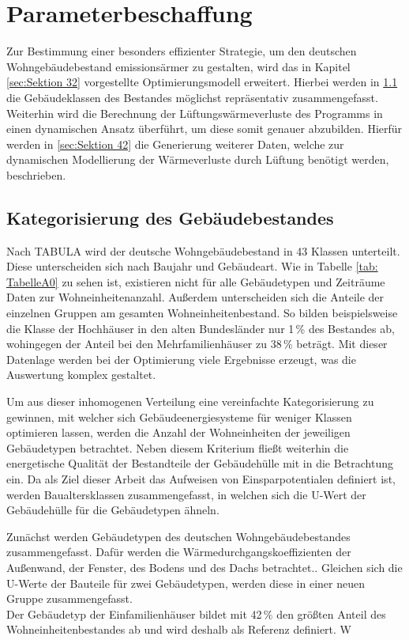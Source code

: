 \chapter{Parameterbeschaffung}

Zur Bestimmung einer besonders effizienter Strategie, um den deutschen Wohngebäudebestand emissionsärmer zu gestalten, wird das in Kapitel \ref{sec:Sektion 32} vorgestellte Optimierungsmodell erweitert.
Hierbei werden in \ref{sec:Sektion 41} die Gebäudeklassen des Bestandes möglichst repräsentativ zusammengefasst.
Weiterhin wird die Berechnung der Lüftungswärmeverluste des Programms in einen dynamischen Ansatz überführt, um diese somit genauer abzubilden.
Hierfür werden in \ref{sec:Sektion 42} die Generierung weiterer Daten, welche zur dynamischen Modellierung der Wärmeverluste durch Lüftung benötigt werden, beschrieben.

\section{Kategorisierung des Gebäudebestandes}
\label{sec:Sektion 41}

Nach TABULA wird der deutsche Wohngebäudebestand in 43 Klassen unterteilt.
Diese unterscheiden sich nach Baujahr und Gebäudeart.
Wie in Tabelle \ref{tab: TabelleA0} zu sehen ist, existieren nicht für alle Gebäudetypen und Zeiträume Daten zur Wohneinheitenanzahl.
Außerdem unterscheiden sich die Anteile der einzelnen Gruppen am gesamten Wohneinheitenbestand.
So bilden beispielsweise die Klasse der Hochhäuser in den alten Bundesländer nur 1\,\% des Bestandes ab, wohingegen der Anteil bei den Mehrfamilienhäuser zu 38\,\% beträgt.
Mit dieser Datenlage werden bei der Optimierung viele Ergebnisse erzeugt, was die Auswertung komplex gestaltet.

Um aus dieser inhomogenen Verteilung eine vereinfachte Kategorisierung zu gewinnen, mit welcher sich Gebäudeenergiesysteme für weniger Klassen optimieren lassen, werden die Anzahl der Wohneinheiten der jeweiligen Gebäudetypen betrachtet.
Neben diesem Kriterium fließt weiterhin die energetische Qualität der Bestandteile der Gebäudehülle mit in die Betrachtung ein.
Da als Ziel dieser Arbeit das Aufweisen von Einsparpotentialen definiert ist, werden Baualtersklassen zusammengefasst, in welchen sich die U-Wert der Gebäudehülle für die Gebäudetypen ähneln.

Zunächst werden Gebäudetypen des deutschen Wohngebäudebestandes zusammengefasst.
Dafür werden die Wärmedurchgangskoeffizienten der Außenwand, der Fenster, des Bodens und des Dachs betrachtet..
Gleichen sich die U-Werte der Bauteile für zwei Gebäudetypen, werden diese in einer neuen Gruppe zusammengefasst.\\
Der Gebäudetyp der Einfamilienhäuser bildet mit 42\,\% den größten Anteil des Wohneinheitenbestandes ab und wird deshalb als Referenz definiert.
W















